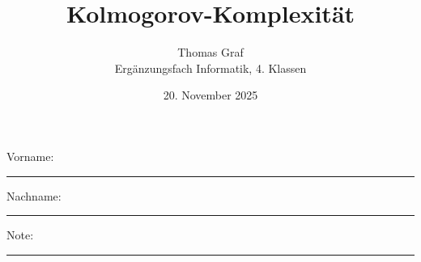 \newtoggle{withbonus} \toggletrue{withbonus} %

\newcommand{\mycourse}{Ergänzungsfach Informatik}
\newcommand{\myclass}{4. Klassen}
\newcommand{\mydate}{20. November 2025}

\title{\textbf{Kolmogorov-Komplexität}}
\author{Thomas Graf\\
	\mycourse, \myclass}
\date{\mydate}
\maketitle
\thispagestyle{headandfoot}

\begin{center}
\end{center}
\vspace{10mm}

\begin{center}
	Vorname: \rule{45mm}{0.8pt}\qquad Nachname: \rule{45mm}{0.8pt}
\end{center}
\vspace{20mm}

\begin{center}
	\iftoggle{withbonus} {
		\combinedgradetable[h][questions]
	} {
		\gradetable[h][questions]
	}
\end{center}
\vspace{15mm}
\begin{center}
	Note:
	\vspace{10mm}

	\rule{8mm}{1.2pt}
\end{center}
\clearpage


